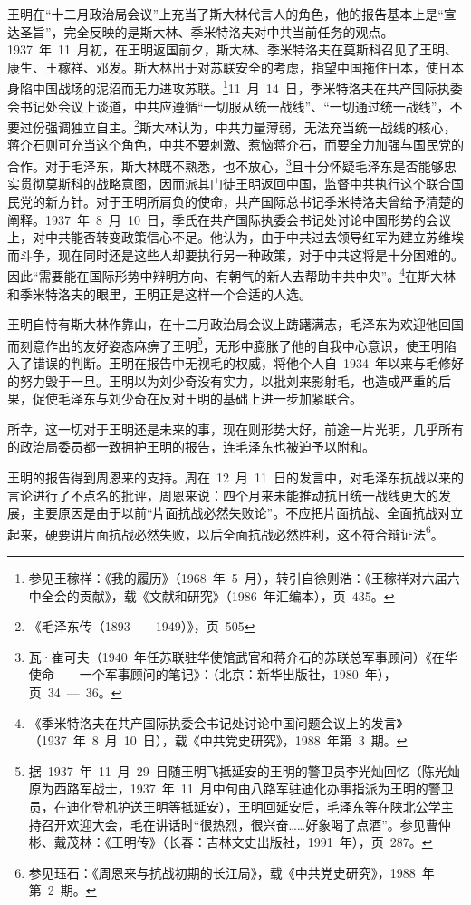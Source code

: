王明在“十二月政治局会议”上充当了斯大林代言人的角色，他的报告基本上是“宣达圣旨”，完全反映的是斯大林、季米特洛夫对中共当前任务的观点。1937~年~11~月初，在王明返国前夕，斯大林、季米特洛夫在莫斯科召见了王明、康生、王稼祥、邓发。斯大林出于对苏联安全的考虑，指望中国拖住日本，使日本身陷中国战场的泥沼而无力进攻苏联。\footnote{参见王稼祥：《我的履历》（1968~年~5~月），转引自徐则浩：《王稼祥对六届六中全会的贡献》，载《文献和研究》（1986~年汇编本），页~435。}11~月~14~日，季米特洛夫在共产国际执委会书记处会议上谈道，中共应遵循“一切服从统一战线”、“一切通过统一战线”，不要过份强调独立自主。\footnote{《毛泽东传（1893~—~1949）》，页~505}斯大林认为，中共力量薄弱，无法充当统一战线的核心，蒋介石则可充当这个角色，中共不要刺激、惹恼蒋介石，而要全力加强与国民党的合作。对于毛泽东，斯大林既不熟悉，也不放心，\footnote{瓦·崔可夫（1940~年任苏联驻华使馆武官和蒋介石的苏联总军事顾问）《在华使命——一个军事顾问的笔记》：（北京：新华出版社，1980~年），页~34~—~36。}且十分怀疑毛泽东是否能够忠实贯彻莫斯科的战略意图，因而派其门徒王明返回中国，监督中共执行这个联合国民党的新方针。对于王明所肩负的使命，共产国际总书记季米特洛夫曾给予清楚的阐释。1937~年~8~月~10~日，季氏在共产国际执委会书记处讨论中国形势的会议上，对中共能否转变政策信心不足。他认为，由于中共过去领导红军为建立苏维埃而斗争，现在同时还是这些人却要执行另一种政策，对于中共这将是十分困难的。因此“需要能在国际形势中辩明方向、有朝气的新人去帮助中共中央”。\footnote{《季米特洛夫在共产国际执委会书记处讨论中国问题会议上的发言》（1937~年~8~月~10~日），载《中共党史研究》，1988~年第~3~期。}在斯大林和季米特洛夫的眼里，王明正是这样一个合适的人选。

王明自恃有斯大林作靠山，在十二月政治局会议上踌躇满志，毛泽东为欢迎他回国而刻意作出的友好姿态麻痹了王明\footnote{据~1937~年~11~月~29~日随王明飞抵延安的王明的警卫员李光灿回忆（陈光灿原为西路军战士，1937~年~11~月中旬由八路军驻迪化办事指派为王明的警卫员，在迪化登机护送王明等抵延安），王明回延安后，毛泽东等在陕北公学主持召开欢迎大会，毛在讲话时“很热烈，很兴奋……好象喝了点酒”。参见曹仲彬、戴茂林：《王明传》（长春：吉林文史出版社，1991~年），页~287。}，无形中膨胀了他的自我中心意识，使王明陷入了错误的判断。王明在报告中无视毛的权威，将他个人自~1934~年以来与毛修好的努力毁于一旦。王明以为刘少奇没有实力，以批刘来影射毛，也造成严重的后果，促使毛泽东与刘少奇在反对王明的基础上进一步加紧联合。

所幸，这一切对于王明还是未来的事，现在则形势大好，前途一片光明，几乎所有的政治局委员都一致拥护王明的报告，连毛泽东也被迫予以附和。

王明的报告得到周恩来的支持。周在~12~月~11~日的发言中，对毛泽东抗战以来的言论进行了不点名的批评，周恩来说：四个月来未能推动抗日统一战线更大的发展，主要原因是由于以前“片面抗战必然失败论”。不应把片面抗战、全面抗战对立起来，硬要讲片面抗战必然失败，以后全面抗战必然胜利，这不符合辩证法\footnote{参见珏石：《周恩来与抗战初期的长江局》，载《中共党史研究》，1988~年第~2~期。}。

